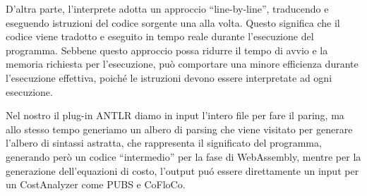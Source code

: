 \documentclass[../../main.tex]{subfiles}
\begin{document}
D'altra parte, l'interprete adotta un approccio ``line-by-line'', traducendo e eseguendo istruzioni del codice sorgente una alla volta. Questo significa che il codice viene tradotto e eseguito in tempo reale durante l'esecuzione del programma. Sebbene questo approccio possa ridurre il tempo di avvio e la memoria richiesta per l'esecuzione, può comportare una minore efficienza durante l'esecuzione effettiva, poiché le istruzioni devono essere interpretate ad ogni esecuzione.

Nel nostro il plug-in ANTLR diamo in input l'intero file per fare il paring, ma allo stesso tempo generiamo un albero di parsing che viene visitato per generare l'albero di sintassi astratta, che rappresenta il significato del programma, generando però un codice ``intermedio'' per la fase di WebAssembly, mentre per la generazione dell'equazioni di costo, l'output puó essere direttamente un input per un CostAnalyzer come PUBS e CoFloCo.
\autocite{DBLP:books/aw/AhoSU86}
\end{document}
